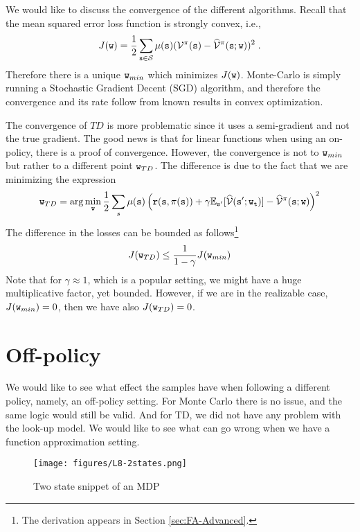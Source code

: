 
We would like to discuss the convergence of the different
algorithms. Recall that the mean squared error loss function is
strongly convex, i.e.,
\[
J({\tt w})=\frac{1}{2}\sum_{{\tt s}\in\mathcal{S}}
\mu({\tt s})(\mathcal{V}^\pi({\tt s})-\widehat{\mathcal{V}}^\pi({\tt s};{\tt w}))^2\;.
\]
Therefore there is a unique ${\tt w}_{min}$ which minimizes
$J({\tt w})$. Monte-Carlo is simply running a Stochastic Gradient
Decent (SGD) algorithm, and therefore the convergence and its rate
follow from known results in convex optimization.

The convergence of $TD$ is more problematic since it uses a
semi-gradient and not the true gradient. The good news is that for
linear functions when using an on-policy, there is a proof of
convergence. However, the convergence is not to ${\tt w}_{min}$ but
rather to a different point ${\tt w}_{TD}$. The difference is due to
the fact that we are minimizing the expression
\[
{\tt w}_{TD}=\arg\min_{\tt w}\frac{1}{2}\sum_s
\mu({\tt s})\left({\tt r}({\tt s},\pi({\tt s}))+\gamma
\mathbb{E}_{{\tt s}'}[\widehat{\mathcal{V}}({\tt s}';{\tt w}_{\tt t})]-\widehat{\mathcal{V}}^\pi({\tt s};{\tt w})\right)^2
\]
The difference in the losses can be bounded as follows\footnote{ The
derivation appears in Section \ref{sec:FA-Advanced}.}
\[
J({\tt w}_{TD})\leq \frac{1}{1-\gamma}J({\tt w}_{min})
\]
Note that for $\gamma\approx 1$, which is a popular setting, we
might have a huge multiplicative factor, yet bounded. However, if we
are in the realizable case, $J({\tt w}_{min})=0$, then we have also
$J({\tt w}_{TD})=0$.




\section{Off-policy}
\label{sec:TD-FA}

We would like to see what effect the samples have when
following a different policy, namely, an off-policy setting. 
For Monte Carlo there is no issue, and the same logic would still be
valid. And for TD, we did not have any problem with the look-up model. We
would like to see what can go wrong when we have a function
approximation setting.


\begin{figure}
  \begin{centering}
  \texttt{[image: figures/L8-2states.png]}\\
  \caption{Two state snippet of an MDP }\label{fig:L8-2state}
  \end{centering}
\end{figure}

